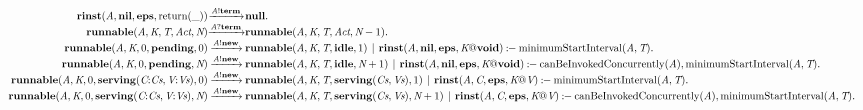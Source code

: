 \[
\begin{array}{r@{}c@{}l}
\\\Pfact{\Tstep{\Trinst{\Tvar{A}}{\Tatom{nil}}{\Tatom{eps}}{\Treturn{\_}}}{\Tsay{\Tvar{A}}{\Tatom{term}}}{\Tatom{null}}}.
\\\Pfact{\Tstep{\Trunnable{\Tvar{A}}{\Tvar{K}}{\Tvar{T}}{\Tvar{Act}}{\Tvar{N}}}{\Thear{\Tvar{A}}{\Tatom{term}}}{\Trunnable{\Tvar{A}}{\Tvar{K}}{\Tvar{T}}{\Tvar{Act}}{\Tminus{\Tvar{N}}{1}}}}.
\\\Prule{\Tstep{\Trunnable{\Tvar{A}}{\Tvar{K}}{0}{\Tatom{pending}}{0}}{\Tsay{\Tvar{A}}{\Tatom{new}}}{\Tpar{\Trunnable{\Tvar{A}}{\Tvar{K}}{\Tvar{T}}{\Tatom{idle}}{1}}{\Trinst{\Tvar{A}}{\Tatom{nil}}{\Tatom{eps}}{\Tap{\Tvar{K}}{\Tatom{void}}}}}}{\TminimumStartInterval{\Tvar{A}}{\Tvar{T}}}.
\\\Prule{\Tstep{\Trunnable{\Tvar{A}}{\Tvar{K}}{0}{\Tatom{pending}}{\Tvar{N}}}{\Tsay{\Tvar{A}}{\Tatom{new}}}{\Tpar{\Trunnable{\Tvar{A}}{\Tvar{K}}{\Tvar{T}}{\Tatom{idle}}{\Tplus{\Tvar{N}}{1}}}{\Trinst{\Tvar{A}}{\Tatom{nil}}{\Tatom{eps}}{\Tap{\Tvar{K}}{\Tatom{void}}}}}}{\TcanBeInvokedConcurrently{\Tvar{A}},\TminimumStartInterval{\Tvar{A}}{\Tvar{T}}}.
\\\Prule{\Tstep{\Trunnable{\Tvar{A}}{\Tvar{K}}{0}{\Tserving{\Tcons{\Tvar{C}}{\Tvar{Cs}}}{\Tcons{\Tvar{V}}{\Tvar{Vs}}}}{0}}{\Tsay{\Tvar{A}}{\Tatom{new}}}{\Tpar{\Trunnable{\Tvar{A}}{\Tvar{K}}{\Tvar{T}}{\Tserving{\Tvar{Cs}}{\Tvar{Vs}}}{1}}{\Trinst{\Tvar{A}}{\Tvar{C}}{\Tatom{eps}}{\Tap{\Tvar{K}}{\Tvar{V}}}}}}{\TminimumStartInterval{\Tvar{A}}{\Tvar{T}}}.
\\\Prule{\Tstep{\Trunnable{\Tvar{A}}{\Tvar{K}}{0}{\Tserving{\Tcons{\Tvar{C}}{\Tvar{Cs}}}{\Tcons{\Tvar{V}}{\Tvar{Vs}}}}{\Tvar{N}}}{\Tsay{\Tvar{A}}{\Tatom{new}}}{\Tpar{\Trunnable{\Tvar{A}}{\Tvar{K}}{\Tvar{T}}{\Tserving{\Tvar{Cs}}{\Tvar{Vs}}}{\Tplus{\Tvar{N}}{1}}}{\Trinst{\Tvar{A}}{\Tvar{C}}{\Tatom{eps}}{\Tap{\Tvar{K}}{\Tvar{V}}}}}}{\TcanBeInvokedConcurrently{\Tvar{A}},\TminimumStartInterval{\Tvar{A}}{\Tvar{T}}}.
\end{array}
\]
